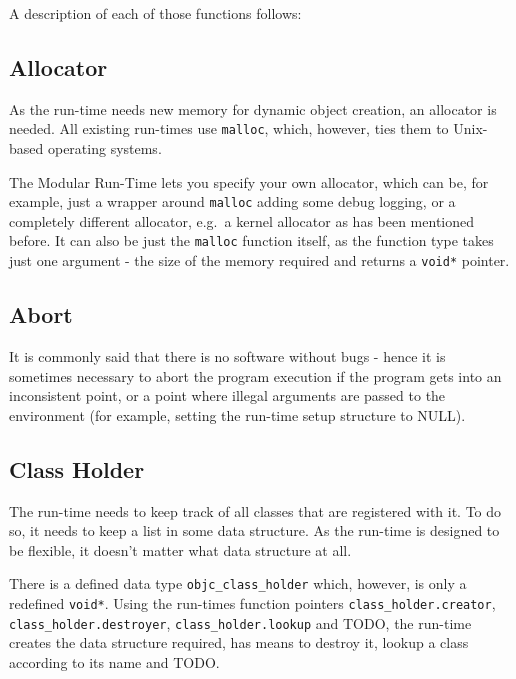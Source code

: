 A description of each of those functions follows:

\subsection{Allocator}

As the run-time needs new memory for dynamic object creation, an allocator is needed. All existing run-times use \verb=malloc=, which, however, ties them to Unix-based operating systems.

The Modular Run-Time lets you specify your own allocator, which can be, for example, just a wrapper around \verb=malloc= adding some debug logging, or a completely different allocator, e.g.\ a kernel allocator as has been mentioned before. It can also be just the \verb=malloc= function itself, as the function type takes just one argument - the size of the memory required and returns a \verb=void*= pointer.

\subsection{Abort}

It is commonly said that there is no software without bugs - hence it is sometimes necessary to abort the program execution if the program gets into an inconsistent point, or a point where illegal arguments are passed to the environment (for example, setting the run-time setup structure to NULL).


\subsection{Class Holder}

The run-time needs to keep track of all classes that are registered with it. To do so, it needs to keep a list in some data structure. As the run-time is designed to be flexible, it doesn't matter what data structure at all.

There is a defined data type \verb=objc_class_holder= which, however, is only a redefined \verb=void*=. Using the run-times function pointers \verb=class_holder.creator=, \verb=class_holder.destroyer=, \verb=class_holder.lookup= and TODO, the run-time creates the data structure required, has means to destroy it, lookup a class according to its name and TODO.

